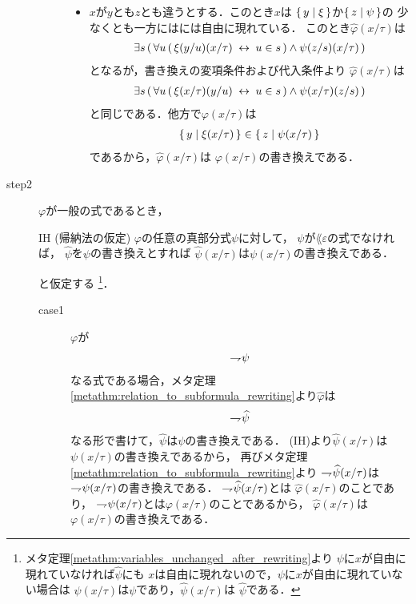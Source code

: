 \begin{metaprf}[第一]
\begin{description}
\begin{description}
\begin{itemize}
							\item $x$が$y$とも$z$とも違うとする．このとき$x$は
								$\{\, y \mid \xi\, \}$か$\{\, z \mid \psi\, \}$の
								少なくとも一方にはには自由に現れている．
								このとき$\widehat{\varphi}(x/\tau)$は
								\begin{align}
									\exists s\, (\, \forall u\, (\, \xi(y/u)(x/\tau) \hspace{0.25em}\leftrightarrow\hspace{0.25em} u \in s\, ) \wedge \psi(z/s)(x/\tau)\, )
								\end{align}
								となるが，書き換えの変項条件および代入条件より
								$\widehat{\varphi}(x/\tau)$は
								\begin{align}
									\exists s\, (\, \forall u\, (\, \xi(x/\tau)(y/u) \hspace{0.25em}\leftrightarrow\hspace{0.25em} u \in s\, ) \wedge \psi(x/\tau)(z/s)\, )
								\end{align}
								と同じである．他方で$\varphi(x/\tau)$は
								\begin{align}
									\{\, y \mid \xi(x/\tau)\, \} \in \{\, z \mid \psi(x/\tau)\, \}
								\end{align}
								であるから，$\widehat{\varphi}(x/\tau)$は
								$\varphi(x/\tau)$の書き換えである．
						\end{itemize}
				\end{description}
			
			\item[step2] $\varphi$が一般の式であるとき，
				\begin{itembox}[l]{IH (帰納法の仮定)}
					$\varphi$の任意の真部分式$\psi$に対して，
					$\psi$が$\lang{\varepsilon}$の式でなければ，
					$\widehat{\psi}$を$\psi$の書き換えとすれば
					$\widehat{\psi}(x/\tau)$は$\psi(x/\tau)$の書き換えである．
				\end{itembox}
				と仮定する
				\footnote{
					メタ定理\ref{metathm:variables_unchanged_after_rewriting}より
					$\psi$に$x$が自由に現れていなければ$\widehat{\psi}$にも
					$x$は自由に現れないので，$\psi$に$x$が自由に現れていない場合は
					$\psi(x/\tau)$は$\psi$であり，$\widehat{\psi}(x/\tau)$は
					$\widehat{\psi}$である．
				}．
				
				\begin{description}
					\item[case1] $\varphi$が
						\begin{align}
							\rightharpoondown\hspace{-0.25em} \psi
						\end{align}
						なる式である場合，メタ定理\ref{metathm:relation_to_subformula_rewriting}より$\widehat{\varphi}$は
						\begin{align}
							\rightharpoondown\hspace{-0.25em} \widehat{\psi}
						\end{align}
						なる形で書けて，$\widehat{\psi}$は$\psi$の書き換えである．
						(IH)より$\widehat{\psi}(x/\tau)$は
						$\psi(x/\tau)$の書き換えであるから，
						再びメタ定理\ref{metathm:relation_to_subformula_rewriting}より
						$\rightharpoondown\hspace{-0.25em} \widehat{\psi}(x/\tau)$は
						$\rightharpoondown\hspace{-0.25em} \psi(x/\tau)$の書き換えである．
						$\rightharpoondown\hspace{-0.25em} \widehat{\psi}(x/\tau)$とは
						$\widehat{\varphi}(x/\tau)$のことであり，
						$\rightharpoondown\hspace{-0.25em} \psi(x/\tau)$とは$\varphi(x/\tau)$のことであるから，
						$\widehat{\varphi}(x/\tau)$は$\varphi(x/\tau)$の書き換えである．
					

\end{description}
\end{description}
\end{metaprf}
